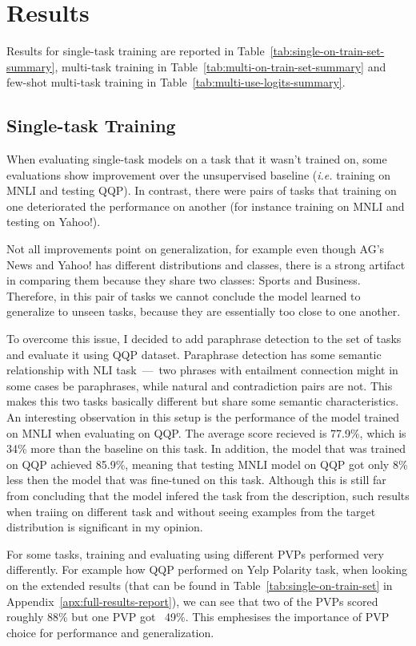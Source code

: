\documentclass[11pt,a4paper]{article}
\begin{document}
\section{Results}
Results for single-task training are reported in Table~\ref{tab:single-on-train-set-summary},
multi-task training in Table~\ref{tab:multi-on-train-set-summary}
and few-shot multi-task training in Table~\ref{tab:multi-use-logits-summary}.

\subsection*{Single-task Training}
When evaluating single-task models on a task that it wasn't trained on, some evaluations show improvement over the unsupervised baseline (\textit{i.e.} training on MNLI and testing QQP).
In contrast, there were pairs of tasks that training on one deteriorated the performance on another (for instance training on MNLI and testing on Yahoo!).

Not all improvements point on generalization, for example even though AG's News and Yahoo! has different distributions and classes, there is a strong artifact in comparing them because they share two classes: Sports and Business.
Therefore, in this pair of tasks we cannot conclude the model learned to generalize to unseen tasks, because they are essentially too close to one another.

To overcome this issue, I decided to add paraphrase detection to the set of tasks and evaluate it using QQP dataset.
Paraphrase detection has some semantic relationship with NLI task~---~two phrases with entailment connection might in some cases be paraphrases, while natural and contradiction pairs are not.
This makes this two tasks basically different but share some semantic characteristics. 
An interesting observation in this setup is the performance of the model trained on MNLI when evaluating on QQP.
The average score recieved is 77.9\%, which is 34\% more than the baseline on this task.
In addition, the model that was trained on QQP achieved 85.9\%, meaning that testing MNLI model on QQP got only 8\% less then the model that was fine-tuned on this task.
Although this is still far from concluding that the model infered the task from the description, such results when traiing on different task and without seeing examples from the target distribution is significant in my opinion.

For some tasks, training and evaluating using different PVPs performed very differently.
For example how QQP performed on Yelp Polarity task, when looking on the extended results (that can be found in Table~\ref{tab:single-on-train-set} in Appendix~\ref{apx:full-results-report}), we can see that two of the PVPs scored roughly 88\% but one PVP got ~49\%.
This emphesises the importance of PVP choice for performance and generalization.
\end{document}
